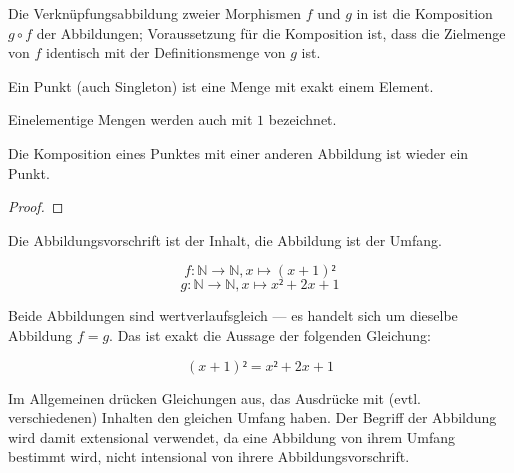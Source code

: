 \documentclass[parskip=half]{scrreprt}
\begin{document}
\begin{remark}
Die Verknüpfungsabbildung zweier Morphismen $f$ und $g$ in 
ist die Komposition $g∘f$ der Abbildungen;
Voraussetzung für die Komposition ist, dass die Zielmenge von $f$ identisch
mit der Definitionsmenge von $g$ ist.
\end{remark}


\begin{definition}[Punkt]%
Ein Punkt (auch Singleton) ist eine Menge mit exakt einem Element.
\end{definition}

\begin{remark}
Einelementige Mengen werden auch mit $1$ bezeichnet.
\end{remark}

\begin{theorem}
Die Komposition eines Punktes mit einer anderen Abbildung ist wieder ein Punkt.
\end{theorem}
\begin{proof}
\end{proof}


\newpage

\begin{remark}

Die Abbildungsvorschrift ist der Inhalt, die Abbildung ist der Umfang.

\begin{example}
$$f : ℕ → ℕ, x ↦ (x+1)²$$
$$g : ℕ → ℕ, x ↦ x²+2x+1$$

Beide Abbildungen sind wertverlaufsgleich --- es handelt sich um dieselbe
Abbildung $f=g$. Das ist exakt die Aussage der folgenden Gleichung:

$$ (x+1)² = x²+2x+1$$

Im Allgemeinen drücken Gleichungen aus, das Ausdrücke mit (evtl. verschiedenen)
Inhalten den gleichen Umfang haben.
Der Begriff der Abbildung wird damit extensional verwendet,
da eine Abbildung von ihrem Umfang bestimmt wird, nicht intensional von  
ihrere Abbildungsvorschrift.
\end{example}
\end{remark}
\end{document}
